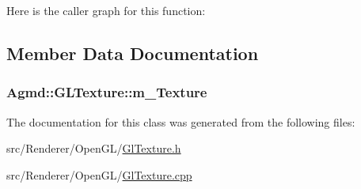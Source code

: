 Here is the caller graph for this function\+:




\subsection{Member Data Documentation}
\hypertarget{class_agmd_1_1_g_l_texture_af69c322f23124938ee25c929d0661f41}{
\subsubsection[{m\+\_\+\+Texture}]{ Agmd\+::\+G\+L\+Texture\+::m\+\_\+\+Texture\hspace{0.3cm}{\ttfamily [protected]}}}\label{class_agmd_1_1_g_l_texture_af69c322f23124938ee25c929d0661f41}


The documentation for this class was generated from the following files\+:\begin{DoxyCompactItemize}
\item 
src/\+Renderer/\+Open\+G\+L/\hyperlink{_gl_texture_8h}{Gl\+Texture.\+h}\item 
src/\+Renderer/\+Open\+G\+L/\hyperlink{_gl_texture_8cpp}{Gl\+Texture.\+cpp}\end{DoxyCompactItemize}
